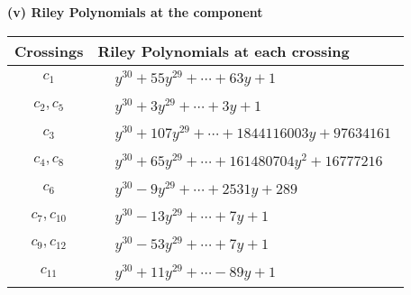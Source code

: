\documentclass[1p]{elsarticle_modified}
\theoremstyle{definition}
\begin{document}
\newpage\renewcommand{\arraystretch}{1}
\flushleft \textbf{(v) Riley Polynomials at the component}\newline \\
\begin{tabular}{m{50pt}|m{274pt}}
Crossings & \hspace{64pt}Riley Polynomials at each crossing \\
\hline $$\begin{aligned}c_{1}\end{aligned}$$&$\begin{aligned}
&y^{30}+55 y^{29}+\cdots+63 y+1
\end{aligned}$\\
\hline $$\begin{aligned}c_{2},c_{5}\end{aligned}$$&$\begin{aligned}
&y^{30}+3 y^{29}+\cdots+3 y+1
\end{aligned}$\\
\hline $$\begin{aligned}c_{3}\end{aligned}$$&$\begin{aligned}
&y^{30}+107 y^{29}+\cdots+1844116003 y+97634161
\end{aligned}$\\
\hline $$\begin{aligned}c_{4},c_{8}\end{aligned}$$&$\begin{aligned}
&y^{30}+65 y^{29}+\cdots+161480704 y^2+16777216
\end{aligned}$\\
\hline $$\begin{aligned}c_{6}\end{aligned}$$&$\begin{aligned}
&y^{30}-9 y^{29}+\cdots+2531 y+289
\end{aligned}$\\
\hline $$\begin{aligned}c_{7},c_{10}\end{aligned}$$&$\begin{aligned}
&y^{30}-13 y^{29}+\cdots+7 y+1
\end{aligned}$\\
\hline $$\begin{aligned}c_{9},c_{12}\end{aligned}$$&$\begin{aligned}
&y^{30}-53 y^{29}+\cdots+7 y+1
\end{aligned}$\\
\hline $$\begin{aligned}c_{11}\end{aligned}$$&$\begin{aligned}
&y^{30}+11 y^{29}+\cdots-89 y+1
\end{aligned}$\\
\hline
\end{tabular}\\~\\
\end{document}
